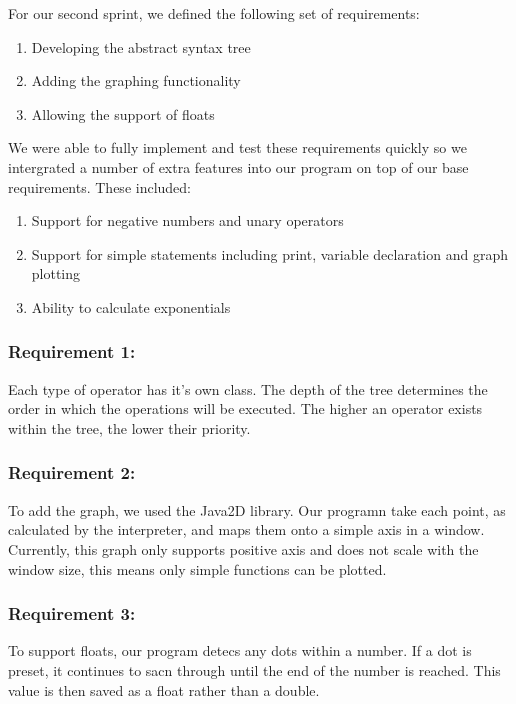 \documentclass[a4paper, oneside, 11pt]{report}
\begin{document}
For our second sprint, we defined the following set of requirements:

\begin{enumerate}
\item Developing the abstract syntax tree
\item Adding the graphing functionality
\item Allowing the support of floats
\end{enumerate}

We were able to fully implement and test these requirements quickly so we intergrated
a number of extra features into our program on top of our base requirements. These
included:
\begin{enumerate}
\item Support for negative numbers and unary operators
\item Support for simple statements including print, variable declaration and graph plotting
\item  Ability to calculate exponentials
\end{enumerate}

\subsubsection{Requirement 1: }

Each type of operator has it's own class. The depth of the tree determines the order in which the operations will be executed. The higher an operator exists within the tree, the lower their priority.

\subsubsection {Requirement 2: }

To add the graph, we used the Java2D library. Our programn take each point, as calculated by the interpreter, and maps them onto a simple axis in a window. Currently, this graph only supports positive axis and does not scale with the window size, this means only simple functions can be plotted.

\subsubsection {Requirement 3: }

To support floats, our program detecs any dots within a number. If a dot is preset, it continues to sacn through until the end of the number is reached. This value is then saved as a float rather than a double.
\end{document}
